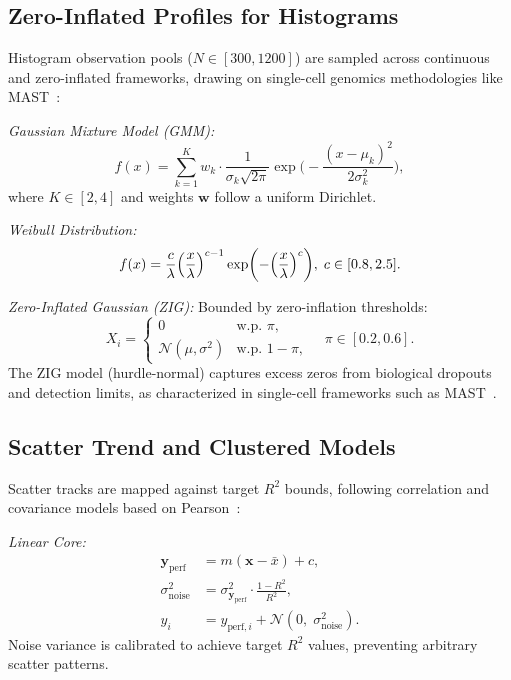 \documentclass[11pt,twocolumn]{article}
\newcommand{\N}{\mathcal{N}}
\begin{document}
\subsection{Zero-Inflated Profiles for Histograms}\label{sec:zeroinflated}

Histogram observation pools ($N \in [300, 1200]$) are sampled across continuous and zero-inflated frameworks, drawing on single-cell genomics methodologies like MAST~\cite{finak2015mast}:

\noindent\emph{Gaussian Mixture Model (GMM):}
\begin{equation}\label{eq:gmm}
  f(x) = \sum_{k=1}^K w_k \cdot \frac{1}{\sigma_k\sqrt{2\pi}}\exp\biggl(-\frac{(x-\mu_k)^2}{2\sigma_k^2}\biggr),
\end{equation}
where $K \in [2,4]$ and weights $\mathbf{w}$ follow a uniform Dirichlet.

\noindent\emph{Weibull Distribution:}
\begin{equation}\label{eq:weibull}
  f(x) = \frac{c}{\lambda}\Bigl(\frac{x}{\lambda}\Bigr)^{c-1}\exp\biggl(-\Bigl(\frac{x}{\lambda}\Bigr)^c\biggr),\; c \in [0.8, 2.5].
\end{equation}

\noindent\emph{Zero-Inflated Gaussian (ZIG):} Bounded by zero-inflation thresholds:
\begin{equation}\label{eq:zig}
  X_i = \begin{cases}
    0 & \text{w.p. } \pi,\\
    \N(\mu,\sigma^2) & \text{w.p. } 1-\pi,
  \end{cases}\quad \pi \in [0.2, 0.6].
\end{equation}
The ZIG model (hurdle-normal) captures excess zeros from biological dropouts and detection limits, as characterized in single-cell frameworks such as MAST~\cite{finak2015mast}.

\subsection{Scatter Trend and Clustered Models}\label{sec:scatter}

Scatter tracks are mapped against target $R^2$ bounds, following correlation and covariance models based on Pearson~\cite{pearson1897mathematical}:

\noindent\emph{Linear Core:}
\begin{align}
  \mathbf{y}_{\text{perf}} &= m(\mathbf{x}-\bar{x}) + c, \label{eq:scatter_linear}\\
  \sigma_{\text{noise}}^2 &= \sigma_{\mathbf{y}_{\text{perf}}}^2 \cdot \frac{1-R^2}{R^2}, \label{eq:scatter_noise}\\
  y_i &= y_{\text{perf},i} + \N(0,\;\sigma_{\text{noise}}^2). \label{eq:scatter_final}
\end{align}
Noise variance is calibrated to achieve target $R^2$ values, preventing arbitrary scatter patterns.
\end{document}
